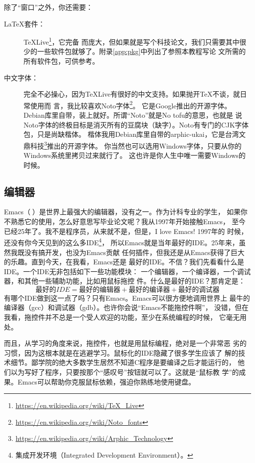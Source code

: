 除了“窗口”之外，你还需要：
\begin{description}
\item[\LaTeX{}套件：] TeXLive\footnote{\url{https://en.wikipedia.org/wiki/TeX_Live}}，它完备
  而庞大，但如果就是写个科技论文，我们只需要其中很少的一些软件包就够了。附录\ref{app:pkg}中列出了参照本教程写论
  文所需的所有软件包，可供参考。
\item[中文字体：] 完全不必操心，因为TeXLive有很好的中文支持。如果抛开\TeX{}不谈，就日常使用而
  言，我比较喜欢Noto字体\footnote{\url{https://en.wikipedia.org/wiki/Noto_fonts}}。
  它是Google推出的开源字体。Debian库里自带，装上就好。所谓“Noto”就是No tofu的意思，也就是
  说Noto字体的终极目标是消灭所有的豆腐块（缺字）。Noto有专门的CJK字体包，只是尚缺楷体。%
  楷体我用Debian库里自带的arphic-ukai，它是台湾文鼎科技\footnote{%
    \url{https://en.wikipedia.org/wiki/Arphic_Technology}}推出的开源字体。
  你当然也可以选用Windows字体，只要从你的Windows系统里拷贝过来就行了。
  这也许是你人生中唯一需要Windows的时候。
\end{description}

\subsection{编辑器}
\label{sec:emacs}

Emacs（）是世界上最强大的编辑器\cite{emacs}，没有之一。作为计科专业的学生，
如果你不熟悉它的使用，怎么好意思写毕业论文呢？我从1997年开始接触Emacs，
至今已经25年了。我不是程序员，从来就不是，但是，I love Emacs! 1997年的
时候，还没有你今天见到的这么多IDE\footnote{集成开发环境（Integrated
  Development Environment）。}，%
所以Emacs就是当年最好的IDE。25年来，虽然我既没有搞开发，也没为Emacs贡献
任何插件，但我还是从Emacs获得了巨大的乐趣。直到今天，在我看，Emacs还是
最好的IDE。不信？我们先看看什么是IDE。一个IDE无非包括如下一些功能模块：
一个编辑器，一个编译器，一个调试器，和其他一些辅助功能，比如用鼠标拖控
件。什么是最好的IDE？那肯定是：
\[
  最好的IDE = 最好的编辑器 + 最好的编译器 + 最好的调试器
\]
有哪个IDE做到这一点了吗？只有Emacs。Emacs可以很方便地调用世界上
最牛的编译器（gcc）和调试器（gdb）。也许你会说“Emacs不能拖控件啊”，
没错，但在我看，拖控件并不总是一个受人欢迎的功能，至少在系统编程的时候，
它毫无用处。

而且，从学习的角度来说，拖控件，也就是用鼠标编程，绝对是一个非常恶
劣的习惯，因为这根本就是在逃避学习。鼠标化的IDE隐藏了很多学生应该了
解的技术细节。鄙学院的绝大多数学生居然不知道C程序是要编译之后才能运行的，
他们以为写好了程序，只要按那个“感叹号”按钮就可以了。这就是“鼠标教
学”的成果。Emacs可以帮助你克服鼠标依赖，强迫你熟练地使用键盘。

